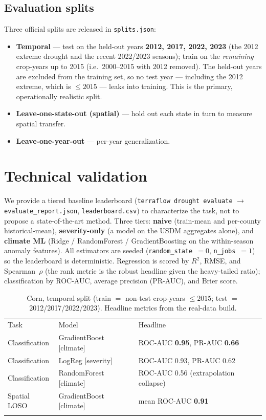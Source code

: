 \documentclass[essd, manuscript]{copernicus}
\begin{document}
\subsection{Evaluation splits}
Three official splits are released in \texttt{splits.json}:
\begin{itemize}
\item \textbf{Temporal} --- test on the held-out years \textbf{2012, 2017, 2022, 2023} (the 2012 extreme drought and the recent 2022/2023 seasons); train on the \emph{remaining} crop-years up to 2015 (i.e.\ 2000--2015 with 2012 removed). The held-out years are excluded from the training set, so no test year --- including the 2012 extreme, which is $\leq 2015$ --- leaks into training. This is the primary, operationally realistic split.
\item \textbf{Leave-one-state-out (spatial)} --- hold out each state in turn to measure spatial transfer.
\item \textbf{Leave-one-year-out} --- per-year generalization.
\end{itemize}

\section{Technical validation}
\label{sec:validation}

We provide a tiered baseline leaderboard (\texttt{terraflow drought evaluate} $\rightarrow$ \texttt{evaluate\_report.json}, \texttt{leaderboard.csv}) to characterize the task, not to propose a state-of-the-art method. Three tiers: \textbf{naive} (train-mean and per-county historical-mean), \textbf{severity-only} (a model on the USDM aggregates alone), and \textbf{climate ML} (Ridge / RandomForest / GradientBoosting on the within-season anomaly features). All estimators are seeded (\texttt{random\_state}~$= 0$, \texttt{n\_jobs}~$= 1$) so the leaderboard is deterministic. Regression is scored by $R^2$, RMSE, and Spearman~$\rho$ (the rank metric is the robust headline given the heavy-tailed ratio); classification by ROC-AUC, average precision (PR-AUC), and Brier score.

\begin{table}[t]
\caption{Corn, temporal split (train $=$ non-test crop-years $\leq 2015$; test $=$ 2012/2017/2022/2023). Headline metrics from the real-data build.}
\begin{tabular}{lll}
\tophline
Task & Model & Headline \\
\middlehline
Classification & GradientBoost [climate]  & ROC-AUC \textbf{0.95}, PR-AUC \textbf{0.66} \\
Classification & LogReg [severity]        & ROC-AUC 0.93, PR-AUC 0.62 \\
Classification & RandomForest [climate]   & ROC-AUC 0.56 (extrapolation collapse) \\
Spatial LOSO   & GradientBoost [climate]  & mean ROC-AUC \textbf{0.91} \\
\bottomhline
\end{tabular}
\belowtable{}
\label{tab:leaderboard}
\end{table}
\end{document}
